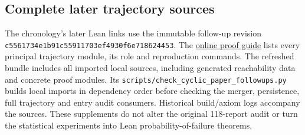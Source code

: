 \documentclass[11pt]{article}
\theoremstyle{definition}
\theoremstyle{remark}
\begin{document}
\subsection{Complete later trajectory sources}
The chronology's later Lean links use the immutable follow-up revision
\nolinkurl{c5561734e1b91c55911703ef4930f6e718624453}.
The \href{https://github.com/alectionary/vibe-math/blob/master/formalization/cyclic-lifts/paper/LEAN-PROOF-GUIDE.md}{online proof guide}
lists every principal trajectory module, its role and reproduction commands.
The refreshed bundle includes all imported local sources, including generated
reachability data and concrete proof modules. Its
\texttt{scripts/check\_cyclic\_paper\_followups.py} builds local imports in
dependency order before checking the merger, persistence, full trajectory
and entry audit consumers. Historical build/axiom logs accompany the sources.
These supplements do not alter the original 118-report audit or turn the
statistical experiments into Lean probability-of-failure theorems.
\end{document}
